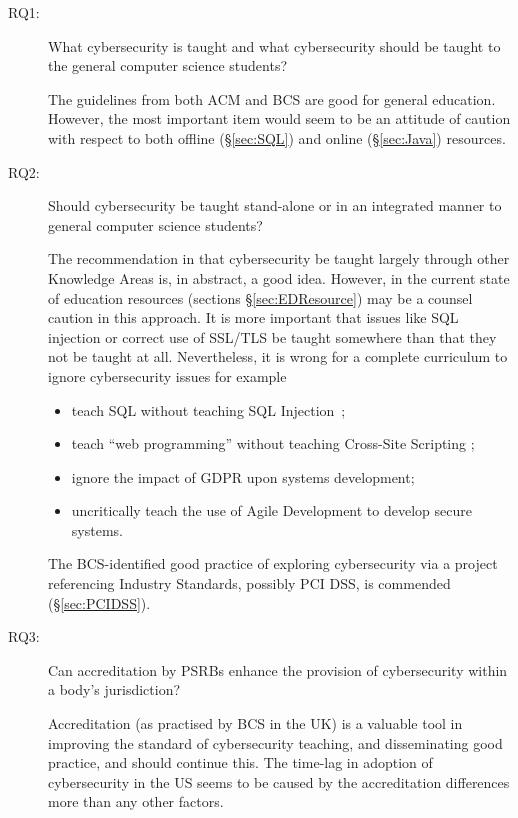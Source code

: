 \documentclass[conference]{IEEEtran}
\begin{document}
\begin{description}
\item[RQ1:] What cybersecurity is taught and what cybersecurity should be taught to the general computer science students?

The guidelines from both ACM and BCS are good for general education. However, the most important item would seem to be an attitude of caution with respect to both offline (\S\ref{sec:SQL}) and online (\S\ref{sec:Java}) resources. 
\item[RQ2:] Should cybersecurity be taught stand-alone or in an integrated manner to general computer science students?

The recommendation in \cite[p. 98]{ACM2013a} that cybersecurity be taught largely through other Knowledge Areas is, in abstract, a good idea.  However, in the current state of education resources (sections \S\ref{sec:EDResource})  may be a counsel caution in this approach.  It is more important that issues like SQL injection \cite{Drop2019} or correct use of SSL/TLS \cite{Chenetal2019a} be taught somewhere than that they not be taught at all.
Nevertheless, it is wrong for a complete curriculum to ignore cybersecurity issues for example
\begin{itemize}
	\item teach SQL without teaching SQL Injection~\cite{Drop2019};
	\item teach ``web programming'' without teaching Cross-Site Scripting \cite[(XSS)]{OWASP2017a};
	\item ignore the  impact of GDPR upon systems development;
	\item uncritically teach the use of Agile Development to develop secure systems.
\end{itemize}
\par
The BCS-identified good practice of exploring cybersecurity via a project referencing Industry Standards, possibly PCI DSS, is commended (\S\ref{sec:PCIDSS}).
\item[RQ3:] Can accreditation by PSRBs enhance the provision of cybersecurity within a body's jurisdiction?

Accreditation (as practised by BCS in the UK) is a valuable tool in improving the standard of cybersecurity teaching, and disseminating good practice, and should continue this. The time-lag in adoption of cybersecurity in the US seems to be caused by the accreditation differences more than any other factors.
\end{description}
\end{document}
